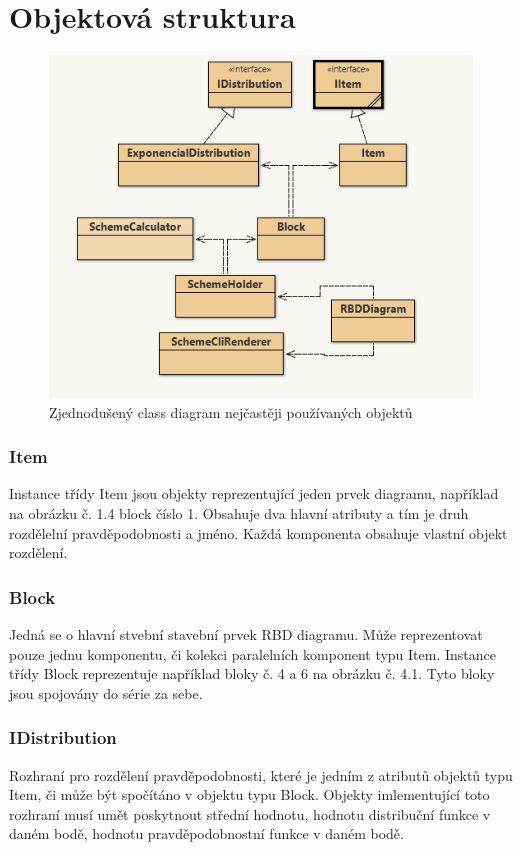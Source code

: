 \documentclass[FM,RP]{tulthesis}
\begin{document}
    \section*{Objektová struktura}
        \begin{figure}[h]
        \centering
        \includegraphics[scale=0.85]{pic/class.png}
        \caption{Zjednodušený class diagram nejčastěji používaných objektů} 
    \end{figure}
        \subsubsection*{Item}
            Instance třídy Item jsou objekty reprezentující jeden prvek diagramu, například na obrázku č. 1.4 block číslo 1. 
            Obsahuje dva hlavní atributy a tím je druh rozdělelní pravděpodobnosti a jméno.
            Každá komponenta obsahuje vlastní objekt rozdělení.
        \subsubsection*{Block}
            Jedná se o hlavní stvební stavební prvek RBD diagramu. 
            Může reprezentovat pouze jednu komponentu, či kolekci paralelních komponent typu Item. 
            Instance třídy Block reprezentuje například bloky č. 4 a 6 na obrázku č. 4.1.
            Tyto bloky jsou spojovány do série za sebe. 
        \subsubsection*{IDistribution}
            Rozhraní pro rozdělení pravděpodobnosti, které je jedním z atributů objektů typu Item, či může být spočítáno v objektu typu Block.
            Objekty imlementující toto rozhraní musí umět poskytnout střední hodnotu, hodnotu distribuční funkce v daném bodě, hodnotu pravděpodobnostní funkce v daném bodě.
\end{document}
